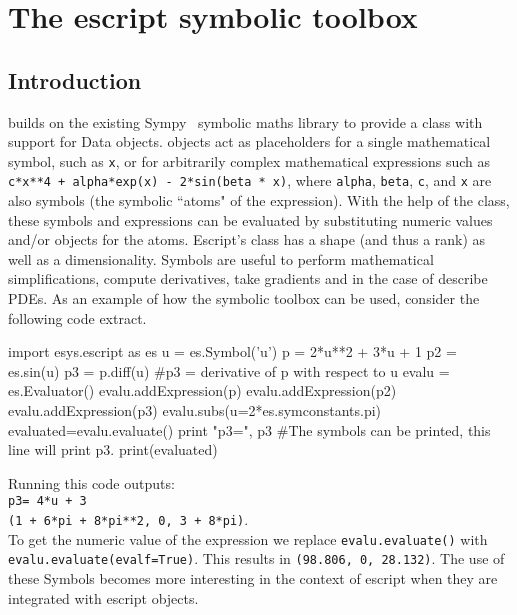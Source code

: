 \chapter{The escript symbolic toolbox}
\label{CHAP:Symbolic}
\section{Introduction}
\escript builds on the existing Sympy~\cite{Sympy} symbolic maths library to
provide a \SYMBOL class with support for \escript Data objects. \SYMBOL objects
act as placeholders for a single mathematical symbol, such as \texttt{x}, or
for arbitrarily complex mathematical expressions such as
\texttt{c*x**4 + alpha*exp(x) - 2*sin(beta * x)}, where \texttt{alpha},
\texttt{beta}, \texttt{c}, and \texttt{x} are also symbols (the symbolic
``atoms" of the expression).
With the help of the \EVALUATOR class, these symbols and expressions can
be evaluated by substituting numeric values and/or \escript \Data objects
for the atoms. Escript's \SYMBOL class has a shape (and thus a rank) as well
as a dimensionality.
Symbols are useful to perform mathematical simplifications, compute
derivatives, take gradients and in the case of \escript describe PDEs.
As an example of how the symbolic toolbox can be used, consider the following
code extract.
\begin{python}
import esys.escript as es
u = es.Symbol('u')
p = 2*u**2 + 3*u + 1
p2 = es.sin(u)
p3 = p.diff(u)            #p3 = derivative of p with respect to u
evalu = es.Evaluator()
evalu.addExpression(p)
evalu.addExpression(p2)
evalu.addExpression(p3)
evalu.subs(u=2*es.symconstants.pi)
evaluated=evalu.evaluate()
print "p3=", p3                  #The symbols can be printed, this line will print p3.
print(evaluated)
\end{python}
Running this code outputs:\\\texttt{p3= 4*u + 3\\(1 + 6*pi + 8*pi**2, 0, 3 + 8*pi)}.\\
To get the numeric value of the expression we replace \texttt{evalu.evaluate()}
with \texttt{evalu.evaluate(evalf=True)}. This results in
\texttt{(98.806, 0, 28.132)}.
The use of these Symbols becomes more interesting in the context of escript
when they are integrated with escript \Data objects.

